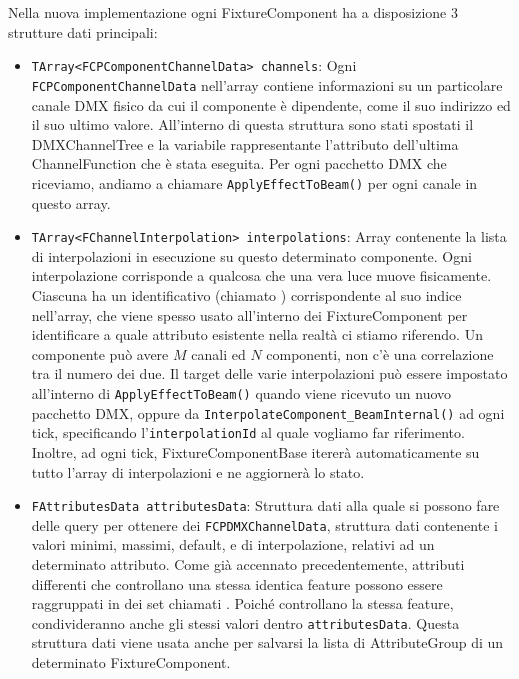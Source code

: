 \documentclass[main.tex]{subfiles}
\begin{document}
\clearpage
\noindent Nella nuova implementazione ogni FixtureComponent ha a disposizione 3 strutture dati principali: 
\begin{itemize}
    \item \lstinline{TArray<FCPComponentChannelData> channels}: Ogni \lstinline{FCPComponentChannelData} nell'array contiene informazioni su un particolare canale DMX fisico da cui il componente è dipendente, come il suo indirizzo ed il suo ultimo valore. All'interno di questa struttura sono stati spostati il DMXChannelTree e la variabile rappresentante l'attributo dell'ultima ChannelFunction che è stata eseguita. Per ogni pacchetto DMX che riceviamo, andiamo a chiamare \lstinline{ApplyEffectToBeam()} per ogni canale in questo array.
    \item \lstinline{TArray<FChannelInterpolation> interpolations}: Array contenente la lista di interpolazioni in esecuzione su questo determinato componente. Ogni interpolazione corrisponde a qualcosa che una vera luce muove fisicamente. Ciascuna ha un identificativo (chiamato ) corrispondente al suo indice nell'array, che viene spesso usato all'interno dei FixtureComponent per identificare a quale attributo esistente nella realtà ci stiamo riferendo. Un componente può avere $M$ canali ed $N$ componenti, non c'è una correlazione tra il numero dei due. Il target delle varie interpolazioni può essere impostato all'interno di \lstinline{ApplyEffectToBeam()} quando viene ricevuto un nuovo pacchetto DMX, oppure da \lstinline{InterpolateComponent_BeamInternal()} ad ogni tick, specificando l'\lstinline{interpolationId} al quale vogliamo far riferimento. Inoltre, ad ogni tick, FixtureComponentBase itererà automaticamente su tutto l'array di interpolazioni e ne aggiornerà lo stato.
    \item \lstinline{FAttributesData attributesData}: Struttura dati alla quale si possono fare delle query per ottenere dei \lstinline{FCPDMXChannelData}, struttura dati contenente i valori minimi, massimi, default, e di interpolazione, relativi ad un determinato attributo. Come già accennato precedentemente, attributi differenti che controllano una stessa identica feature possono essere raggruppati in dei set chiamati . Poiché controllano la stessa feature, condivideranno anche gli stessi valori dentro \lstinline{attributesData}. Questa struttura dati viene usata anche per salvarsi la lista di AttributeGroup di un determinato FixtureComponent.
\end{itemize}
\end{document}
